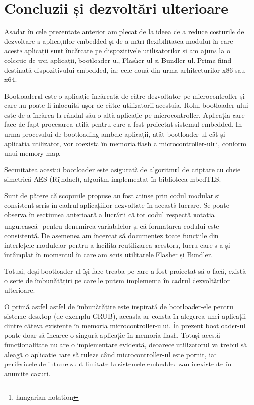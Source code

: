 \documentclass[12pt,a4paper,titlepage]{report}
\begin{document}
\section{Concluzii și dezvoltări ulterioare}

Așadar în cele prezentate anterior am plecat de la ideea de a reduce costurile de dezvoltare a aplicațiilor embedded și de a mări flexibilitatea modului în care aceste aplicații sunt încărcate pe dispozitivele utilizatorilor și am ajuns la o colecție de trei aplicații, bootloader-ul, Flasher-ul și Bundler-ul. Prima fiind destinată dispozitivului embedded, iar cele două din urmă arhitecturilor x86 sau x64.

Bootloaderul este o aplicație încărcată de către dezvoltator pe microcontroller și care nu poate fi înlocuită ușor de către utilizatorii acestuia.
Rolul bootloader-ului este de a încărca la rândul său o altă aplicație pe microcontroller. Aplicația care face de fapt procesarea utilă pentru care a fost proiectat sistemul embedded.
În urma procesului de bootloading ambele aplicații, atât bootloader-ul cât și aplicația utilizator, vor coexista în
memoria flash a microcontroller-ului, conform unui memory map.

Securitatea acestui bootloader este asigurată de algoritmul de criptare cu cheie simetrică AES (Rijndael), algoritm implementat în biblioteca mbedTLS.

Sunt de părere că scopurile propuse au fost atinse prin codul modular și consistent scris în cadrul aplicațiilor dezvoltate în această lucrare. Se poate observa în secțiunea anterioară a lucrării că tot codul respectă notația ungurească\footnote{hungarian notation} pentru denumirea variabilelor și că formatarea codului este consistentă. De asemenea am încercat să documentez toate funcțiile din interfețele modulelor pentru a facilita reutilizarea acestora, lucru care s-a și întâmplat în momentul în care am scris utilitarele Flasher și Bundler.

Totuși, deși bootloader-ul își face treaba pe care a fost proiectat să o facă, există o serie de îmbunătățiri pe care le putem implementa în cadrul dezvoltărilor ulterioare.

O primă astfel astfel de îmbunătățire este inspirată de bootloader-ele pentru sisteme desktop (de exemplu GRUB), aceasta ar consta în alegerea unei aplicații dintre câteva existente în memoria microcontroller-ului. În prezent bootloader-ul poate doar să încarce o singură aplicație în memoria flash. Totuși acestă funcționalitate nu are o implementare evidentă, deoarece utilizatorul va trebui să aleagă o aplicație care să ruleze când microcontroller-ul este pornit, iar perifericele de intrare sunt limitate la sistemele embedded sau inexistente în anumite cazuri.
\end{document}
